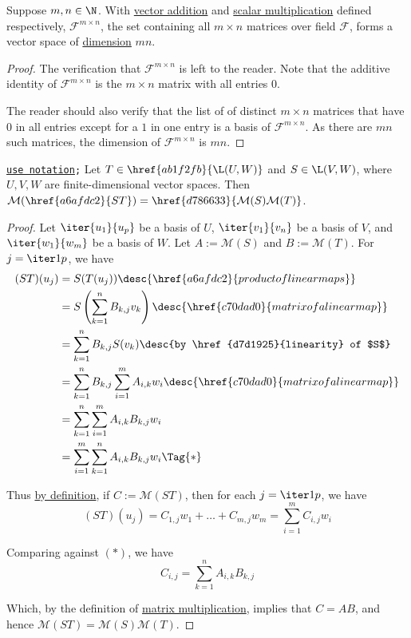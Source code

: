 \label{f2db1b2}

Suppose $m,n\in\N$. With \href{e41b441}{vector addition} and
\href{d36252c}{scalar multiplication} defined respectively, $\mathcal
F^{m\times n}$, the set containing all $m\times n$ matrices over field
$\mathcal F$, forms a vector space of \href{cd4284b}{dimension} $mn$.

\begin{proof}
  The verification that $\mathcal F^{m\times n}$ is left to the reader. Note
  that the additive identity of $\mathcal F^{m\times n}$ is the $m\times n$
  matrix with all entries $0$.

  The reader should also verify that the list of of distinct $m\times n$
  matrices that have $0$ in all entries except for a $1$ in one entry is a
  basis of $\mathcal F^{m\times n}$. As there are $mn$ such matrices, the
  dimension of $\mathcal F^{m\times n}$ is $mn$.
\end{proof}

\label{d35daba}

\texttt{\href{d76dfe6}{use notation};} Let $T\in\href{ab1f2fb}{\L(U,W)}$ and
$S\in\L(V,W)$, where $U,V,W$ are finite-dimensional vector spaces. Then
$\mathcal M(\href{a6afdc2}{ST})=\href{d786633}{\mathcal M(S)\mathcal M(T)}$.

\begin{proof}
  Let $\iter{u_1}{u_p}$ be a basis of $U$, $\iter{v_1}{v_n}$ be a basis of $V$,
  and $\iter{w_1}{w_m}$ be a basis of $W$. Let $A:=\mathcal M(S)$ and
  $B:=\mathcal M(T)$. For $j=\iter1p$, we have
  \begin{align*}
    (ST)(u_j) &=S(T(u_j))\desc{\href{a6afdc2}{product of linear maps}}                                 \\
              &=S\left(\sum_{k=1}^nB_{k,j}v_k\right)\desc{\href{c70dad0}{matrix of a linear map}}      \\
              &=\sum_{k=1}^nB_{k,j}S(v_k)\desc{by \href{d7d1925}{linearity} of $S$}                    \\
              &=\sum_{k=1}^nB_{k,j}\sum_{i=1}^mA_{i,k}w_i\desc{\href{c70dad0}{matrix of a linear map}} \\
              &=\sum_{k=1}^n\sum_{i=1}^mA_{i,k}B_{k,j}w_i                                              \\
              &=\sum_{i=1}^m\sum_{k=1}^nA_{i,k}B_{k,j}w_i\Tag{*}
  \end{align*}

  Thus \href{c70dad0}{by definition}, if $C:=\mathcal M(ST)$, then for each
  $j=\iter1p$, we have
  \begin{equation*}
    (ST)(u_j)=C_{1,j}w_1+\ldots+C_{m,j}w_m=\sum_{i=1}^mC_{i,j}w_i
  \end{equation*}

  Comparing against $(*)$, we have
  $$
    C_{i,j}=\sum_{k=1}^nA_{i,k}B_{k,j}
  $$

  Which, by the definition of \href{d786633}{matrix multiplication}, implies
  that $C=AB$, and hence $\mathcal M(ST)=\mathcal M(S)\mathcal M(T)$.
\end{proof}
